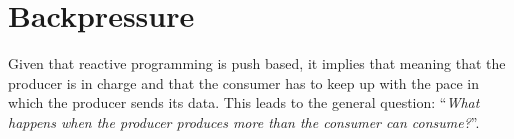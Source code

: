 \section{Backpressure}
Given that reactive programming is push based, it implies that meaning that the producer is in charge and that the consumer has to keep up with the pace in which the producer sends its data. This leads to the general question: ``\emph{What happens when the producer produces more than the consumer can consume?}''. 